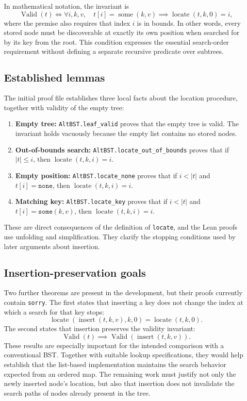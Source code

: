 \documentclass[10pt]{article}
\begin{document}
In mathematical notation, the invariant is
\[
  \operatorname{Valid}(t)
  \iff
  \forall i,k,v,\quad
  t[i]=\operatorname{some}(k,v)
  \implies \operatorname{locate}(t,k,0)=i,
\]
where the premise also requires that index $i$ is in bounds. In other words, every stored node must be discoverable at exactly its own position when searched for by its key from the root. This condition expresses the essential search-order requirement without defining a separate recursive predicate over subtrees.

\subsection{Established lemmas}

The initial proof file establishes three local facts about the location procedure, together with validity of the empty tree:

\begin{enumerate}[leftmargin=1.5em,itemsep=0.25em]
\item \textbf{Empty tree:} \texttt{AltBST.leaf\_valid} proves that the empty tree is valid. The invariant holds vacuously because the empty list contains no stored nodes.
\item \textbf{Out-of-bounds search:} \texttt{AltBST.locate\_out\_of\_bounds} proves that if $|t|\le i$, then $\operatorname{locate}(t,k,i)=i$.
\item \textbf{Empty position:} \texttt{AltBST.locate\_none} proves that if $i<|t|$ and $t[i]=\texttt{none}$, then $\operatorname{locate}(t,k,i)=i$.
\item \textbf{Matching key:} \texttt{AltBST.locate\_key} proves that if $i<|t|$ and $t[i]=\texttt{some}(k,v)$, then $\operatorname{locate}(t,k,i)=i$.
\end{enumerate}

These are direct consequences of the definition of \texttt{locate}, and the Lean proofs use unfolding and simplification. They clarify the stopping conditions used by later arguments about insertion.

\subsection{Insertion-preservation goals}

Two further theorems are present in the development, but their proofs currently contain \texttt{sorry}. The first states that inserting a key does not change the index at which a search for that key stops:
\[
  \operatorname{locate}(\operatorname{insert}(t,k,v),k,0)
  =\operatorname{locate}(t,k,0).
\]
The second states that insertion preserves the validity invariant:
\[
  \operatorname{Valid}(t)
  \implies \operatorname{Valid}(\operatorname{insert}(t,k,v)).
\]
These results are especially important for the intended comparison with a conventional BST. Together with suitable lookup specifications, they would help establish that the list-based implementation maintains the search behavior expected from an ordered map. The remaining work must justify not only the newly inserted node's location, but also that insertion does not invalidate the search paths of nodes already present in the tree.
\end{document}
